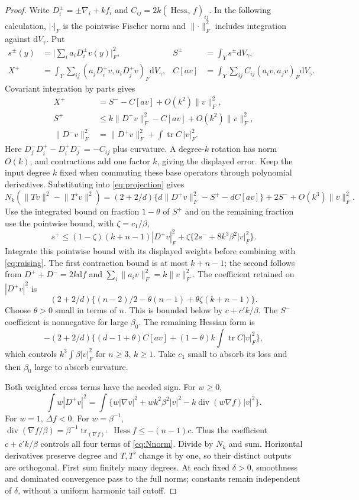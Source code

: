 \documentclass[11pt]{article}
\theoremstyle{definition}\newtheorem{definition}[theorem]{Definition}
\theoremstyle{remark}\newtheorem{remark}[theorem]{Remark}
\newcommand{\dd}{\mathrm d}
\newcommand{\vol}{\dd V}
\newcommand{\Hess}{\operatorname{Hess}}
\newcommand{\Div}{\operatorname{div}}
\newcommand{\tr}{\operatorname{tr}}
\newcommand{\norm}[1]{\lVert #1\rVert}
\begin{document}
\begin{proof}
Write $D_i^\pm=\pm\nabla_i+kf_i$ and $C_{ij}=2k(\Hess_\gamma f)_{ij}$.
In the following calculation, $|\cdot|_F$ is the pointwise Fischer norm
and $\norm{\cdot}_F^2$ includes integration against $\vol_\gamma$.
Put
\[
 \begin{aligned}
 s^\pm(y)&=\bigl|\textstyle\sum_i a_iD_i^\pm v(y)\bigr|_F^2,
 &S^\pm&=\int_Ys^\pm\vol_\gamma,\\
 X^+&=\int_Y\sum_{ij}(a_jD_i^+v,a_iD_j^+v)_F\vol_\gamma,
 &C[av]&=\int_Y\sum_{ij}C_{ij}(a_iv,a_jv)_F\vol_\gamma.
 \end{aligned}
\]
Covariant integration by parts gives
\begin{align*}
 X^+&=S^--C[av]+O(k^2)\norm{v}_F^2,\\
 S^+&\le k\norm{D^-v}_F^2-C[av]+O(k^2)\norm{v}_F^2,\\
 \norm{D^-v}_F^2&=\norm{D^+v}_F^2+\int\tr C\,|v|_F^2.
\end{align*}
Here $D_j^-D_i^+-D_i^+D_j^-=-C_{ij}$ plus curvature.
A degree-$k$ rotation has norm $O(k)$, and contractions add one factor
$k$, giving the displayed error. Keep the input degree $k$ fixed when
commuting these base operators through polynomial derivatives.
Substituting into \eqref{eq:projection} gives
\begin{equation}\label{eq:raising}
 N_k(\norm{Tv}^2-\norm{T^\flat v}^2)
 =(2+2/d)\{d\norm{D^+v}_F^2-S^+-dC[av]\}
                  +2S^-+O(k^3)\norm{v}_F^2.
\end{equation}
Use the integrated bound on fraction $1-\theta$ of $S^+$ and on the
remaining fraction use the pointwise bound, with $\zeta=c_1/\beta$,
\[
 s^+\le(1-\zeta)(k+n-1)|D^+v|_F^2+
           \zeta\{2s^-+8k^3\beta^2|v|_F^2\}.
\]
Integrate this pointwise bound with its displayed weights before combining
with \eqref{eq:raising}. The first contraction bound is at most $k+n-1$;
the second follows from
$D^++D^-=2k\dd f$ and $\sum_i\norm{a_iv}_F^2=k\norm{v}_F^2$.
The coefficient retained on $|D^+v|^2$ is
\[
 (2+2/d)\{(n-2)/2-\theta(n-1)+\theta\zeta(k+n-1)\}.
\]
Choose $\theta>0$ small in terms of $n$. This is bounded below by
$c+c'k/\beta$. The $S^-$ coefficient is nonnegative for large $\beta_0$.
The remaining Hessian form is
\[
 -(2+2/d)\{(d-1+\theta)C[av]+(1-\theta)k\int\tr C|v|_F^2\},
\]
which controls $k^3\int\beta|v|_F^2$ for $n\ge3$, $k\ge1$.
Take $c_1$ small to absorb its loss and then $\beta_0$ large to absorb
curvature.

Both weighted cross terms have the needed sign. For $w\ge0$,
\[
 \int w|D^+v|^2=\int\{w|\nabla v|^2+wk^2\beta^2|v|^2
                               -k\Div(w\nabla f)|v|^2\}.
\]
For $w=1$, $\Delta f<0$. For $w=\beta^{-1}$,
$\Div(\nabla f/\beta)=\beta^{-1}\tr_{(\nabla f)^\perp}\Hess f\le-(n-1)c$.
Thus the coefficient $c+c'k/\beta$ controls all four terms of
\eqref{eq:Nnorm}. Divide by $N_k$ and sum. Horizontal derivatives preserve
degree and $T,T^\flat$ change it by one, so their distinct outputs are
orthogonal. First sum finitely many degrees. At each fixed $\delta>0$,
smoothness and dominated convergence pass to the full norms; constants
remain independent of $\delta$, without a uniform harmonic tail cutoff.
\end{proof}
\end{document}
